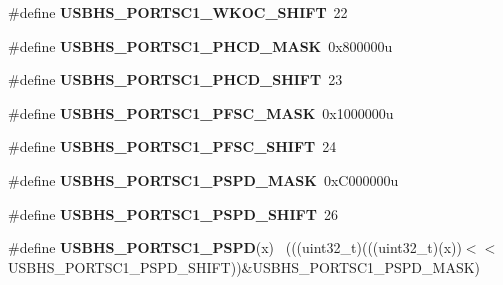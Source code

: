 \begin{DoxyCompactItemize}
\item 
\hypertarget{group___u_s_b_h_s___register___masks_ga41b739d926310d9462cf1d66b8d1473c}{}\#define {\bfseries U\+S\+B\+H\+S\+\_\+\+P\+O\+R\+T\+S\+C1\+\_\+\+W\+K\+O\+C\+\_\+\+S\+H\+I\+F\+T}~22\label{group___u_s_b_h_s___register___masks_ga41b739d926310d9462cf1d66b8d1473c}

\item 
\hypertarget{group___u_s_b_h_s___register___masks_gacd6588cb7905ed0081cff5cec39e2f94}{}\#define {\bfseries U\+S\+B\+H\+S\+\_\+\+P\+O\+R\+T\+S\+C1\+\_\+\+P\+H\+C\+D\+\_\+\+M\+A\+S\+K}~0x800000u\label{group___u_s_b_h_s___register___masks_gacd6588cb7905ed0081cff5cec39e2f94}

\item 
\hypertarget{group___u_s_b_h_s___register___masks_gab7e259fa90d24053a6de7e6552b1c39a}{}\#define {\bfseries U\+S\+B\+H\+S\+\_\+\+P\+O\+R\+T\+S\+C1\+\_\+\+P\+H\+C\+D\+\_\+\+S\+H\+I\+F\+T}~23\label{group___u_s_b_h_s___register___masks_gab7e259fa90d24053a6de7e6552b1c39a}

\item 
\hypertarget{group___u_s_b_h_s___register___masks_gaa5016da4941e29827564212952cb4178}{}\#define {\bfseries U\+S\+B\+H\+S\+\_\+\+P\+O\+R\+T\+S\+C1\+\_\+\+P\+F\+S\+C\+\_\+\+M\+A\+S\+K}~0x1000000u\label{group___u_s_b_h_s___register___masks_gaa5016da4941e29827564212952cb4178}

\item 
\hypertarget{group___u_s_b_h_s___register___masks_ga8945613aafe4955edec9596d6772c210}{}\#define {\bfseries U\+S\+B\+H\+S\+\_\+\+P\+O\+R\+T\+S\+C1\+\_\+\+P\+F\+S\+C\+\_\+\+S\+H\+I\+F\+T}~24\label{group___u_s_b_h_s___register___masks_ga8945613aafe4955edec9596d6772c210}

\item 
\hypertarget{group___u_s_b_h_s___register___masks_gaf88c2c4952bb9ede6d96c1b26f242e1f}{}\#define {\bfseries U\+S\+B\+H\+S\+\_\+\+P\+O\+R\+T\+S\+C1\+\_\+\+P\+S\+P\+D\+\_\+\+M\+A\+S\+K}~0x\+C000000u\label{group___u_s_b_h_s___register___masks_gaf88c2c4952bb9ede6d96c1b26f242e1f}

\item 
\hypertarget{group___u_s_b_h_s___register___masks_ga0b967acd1405b10d5d592f54ca840d6e}{}\#define {\bfseries U\+S\+B\+H\+S\+\_\+\+P\+O\+R\+T\+S\+C1\+\_\+\+P\+S\+P\+D\+\_\+\+S\+H\+I\+F\+T}~26\label{group___u_s_b_h_s___register___masks_ga0b967acd1405b10d5d592f54ca840d6e}

\item 
\hypertarget{group___u_s_b_h_s___register___masks_ga308a40e023c8a2ab7e6f396c8ec92076}{}\#define {\bfseries U\+S\+B\+H\+S\+\_\+\+P\+O\+R\+T\+S\+C1\+\_\+\+P\+S\+P\+D}(x)                                    ~(((uint32\+\_\+t)(((uint32\+\_\+t)(x))$<$$<$U\+S\+B\+H\+S\+\_\+\+P\+O\+R\+T\+S\+C1\+\_\+\+P\+S\+P\+D\+\_\+\+S\+H\+I\+F\+T))\&U\+S\+B\+H\+S\+\_\+\+P\+O\+R\+T\+S\+C1\+\_\+\+P\+S\+P\+D\+\_\+\+M\+A\+S\+K)\label{group___u_s_b_h_s___register___masks_ga308a40e023c8a2ab7e6f396c8ec92076}


\end{DoxyCompactItemize}

